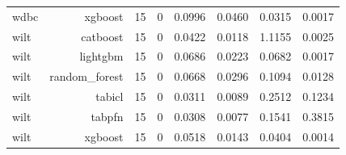 \begin{table}[htbp]
\begin{tabular}{lrrrrrrr}
wdbc & xgboost & 15 & 0 & 0.0996 & 0.0460 & 0.0315 & 0.0017 \\
wilt & catboost & 15 & 0 & 0.0422 & 0.0118 & 1.1155 & 0.0025 \\
wilt & lightgbm & 15 & 0 & 0.0686 & 0.0223 & 0.0682 & 0.0017 \\
wilt & random\_forest & 15 & 0 & 0.0668 & 0.0296 & 0.1094 & 0.0128 \\
wilt & tabicl & 15 & 0 & 0.0311 & 0.0089 & 0.2512 & 0.1234 \\
wilt & tabpfn & 15 & 0 & 0.0308 & 0.0077 & 0.1541 & 0.3815 \\
wilt & xgboost & 15 & 0 & 0.0518 & 0.0143 & 0.0404 & 0.0014 \\
\hline
\end{tabular}
\end{table}
